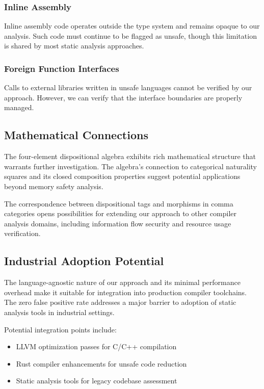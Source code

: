 \documentclass[journal]{IEEEtran}
\begin{document}
\subsubsection{Inline Assembly}
Inline assembly code operates outside the type system and remains opaque to our analysis. Such code must continue to be flagged as unsafe, though this limitation is shared by most static analysis approaches.

\subsubsection{Foreign Function Interfaces}
Calls to external libraries written in unsafe languages cannot be verified by our approach. However, we can verify that the interface boundaries are properly managed.

\subsection{Mathematical Connections}

The four-element dispositional algebra exhibits rich mathematical structure that warrants further investigation. The algebra's connection to categorical naturality squares and its closed composition properties suggest potential applications beyond memory safety analysis.

The correspondence between dispositional tags and morphisms in comma categories opens possibilities for extending our approach to other compiler analysis domains, including information flow security and resource usage verification.

\subsection{Industrial Adoption Potential}

The language-agnostic nature of our approach and its minimal performance overhead make it suitable for integration into production compiler toolchains. The zero false positive rate addresses a major barrier to adoption of static analysis tools in industrial settings.

Potential integration points include:
\begin{itemize}
\item LLVM optimization passes for C/C++ compilation
\item Rust compiler enhancements for unsafe code reduction
\item Static analysis tools for legacy codebase assessment
\end{itemize}
\end{document}
